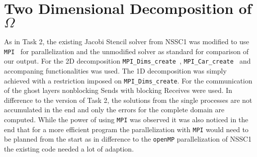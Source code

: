 \section*{Two Dimensional Decomposition of $\Omega$}

As in Task 2, the existing Jacobi Stencil solver from NSSC1 was modified to use \texttt{MPI } for parallelization and the unmodified solver as standard for comparison of our output.
For the 2D decomposition \texttt{MPI\_Dims\_create }, \texttt{MPI\_Car\_create } and accompaning functionalities was used. 
The 1D decomposition was simply achieved with a restriction imposed on \texttt{MPI\_Dims\_create}.
For the communication of the ghost layers nonblocking Sends with blocking Receives were used.
In difference to the version of Task 2, the solutions from the single processes are not accumulated in the end and only the errors for the complete domain are computed.
While the power of using \texttt{MPI} was observed it was also noticed in the end that for a more efficient program the parallelization with \texttt{MPI} would need to be planned from the start 
as in difference to the \texttt{openMP} parallelization of NSSC1 the existing code needed a lot of adaption.
